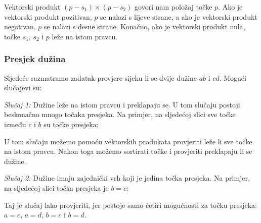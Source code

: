 Vektorski produkt $(p-s_1) \times (p-s_2)$
govori nam položaj točke $p$.
Ako je vektorski produkt pozitivan,
$p$ se nalazi s lijeve strane,
a ako je vektorski produkt negativan,
$p$ se nalazi s desne strane.
Konačno, ako je vektorski produkt nula,
točke $s_1$, $s_2$ i $p$ leže na istom pravcu.

\subsubsection{Presjek dužina}


Sljedeće razmatramo zadatak provjere
sijeku li se dvije dužine
$ab$ i $cd$. Mogući slučajevi su:

\textit{Slučaj 1:}
Dužine leže na istom pravcu
i preklapaju se.
U tom slučaju postoji beskonačno mnogo
točaka presjeka.
Na primjer, na sljedećoj slici
sve točke između $c$ i $b$ su
točke presjeka:
\begin{center}
\end{center}

U tom slučaju možemo pomoću vektorskih produkata
provjeriti leže li sve točke na istom pravcu.
Nakon toga možemo sortirati točke i provjeriti
preklapaju li se dužine.

\textit{Slučaj 2:}
Dužine imaju zajednički vrh
koji je jedina točka presjeka.
Na primjer, na sljedećoj slici
točka presjeka je $b=c$:

\begin{center}
\end{center}

Taj je slučaj lako provjeriti, jer
postoje samo četiri mogućnosti
za točku presjeka:
$a=c$, $a=d$, $b=c$ i $b=d$.

